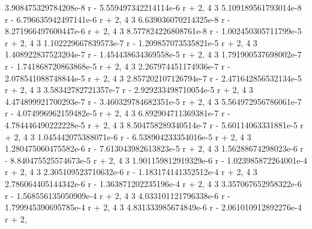 \documentclass[12pt,arial,letterpaper]{book}
\begin{document}
\begin{eulercomment}
\begin{eulercomment}
\begin{eulercomment}
\begin{eulercomment}
\begin{eulercomment}
\begin{eulercomment}
\begin{eulercomment}
\begin{eulercomment}
\begin{eulercomment}
\begin{eulercomment}
\begin{eulercomment}
\begin{eulercomment}
\begin{eulercomment}
\begin{eulercomment}
\begin{eulercomment}
\begin{eulercomment}
\begin{eulercomment}
\begin{eulercomment}
\begin{eulercomment}
\begin{eulercomment}
\begin{eulercomment}
\begin{eulercomment}
\begin{euleroutput}
  3.908475329784208e-8 r  - 5.559497342214114e-6 r  + 2, 
                        4                         3
  5.109189561793014e-8 r  - 6.796635942497141e-6 r  + 2, 
                        4                         3
  6.639036070214325e-8 r  - 8.271966497600447e-6 r  + 2, 
                        4                         3
  8.577824226808761e-8 r  - 1.002450305711799e-5 r  + 2, 
                        4                         3
  1.102229667839573e-7 r  - 1.209857073535821e-5 r  + 2, 
                        4                         3
  1.408922837523204e-7 r  - 1.454438634369558e-5 r  + 2, 
                        4                         3
  1.791900537698002e-7 r  - 1.741868720863868e-5 r  + 2, 
                        4                         3
  2.267974451174936e-7 r  - 2.078541088748844e-5 r  + 2, 
                        4                         3
  2.857202107126794e-7 r  - 2.471642856532134e-5 r  + 2, 
                       4                         3
  3.58342782721357e-7 r  - 2.929233498710054e-5 r  + 2, 
                        4                         3
  4.474899921700293e-7 r  - 3.460329784682351e-5 r  + 2, 
                        4                         3
  5.564972956786061e-7 r  - 4.074996962159482e-5 r  + 2, 
                        4                         3
  6.892904711369381e-7 r  - 4.784446490222228e-5 r  + 2, 
                        4                        3
  8.504758289340514e-7 r  - 5.60114063331881e-5 r  + 2, 
                        4                         3
  1.045442075388071e-6 r  - 6.538904233354016e-5 r  + 2, 
                        4                         3
  1.280475060475582e-6 r  - 7.613043982613823e-5 r  + 2, 
                       4                         3
  1.56288674298023e-6 r  - 8.840475525574673e-5 r  + 2, 
                        4                         3
  1.901159812919329e-6 r  - 1.023985872264001e-4 r  + 2, 
                        4                         3
  2.305109523710632e-6 r  - 1.183174141352512e-4 r  + 2, 
                        4                         3
  2.786064405144342e-6 r  - 1.363871202235196e-4 r  + 2, 
                        4                         3
  3.357067652958322e-6 r  - 1.568556135050909e-4 r  + 2, 
                        4                         3
  4.033101121796338e-6 r  - 1.799945390695785e-4 r  + 2, 
                        4                         3
  4.831333985674849e-6 r  - 2.061010912892276e-4 r  + 2, 

\end{euleroutput}
\end{eulercomment}
\end{eulercomment}
\end{eulercomment}
\end{eulercomment}
\end{eulercomment}
\end{eulercomment}
\end{eulercomment}
\end{eulercomment}
\end{eulercomment}
\end{eulercomment}
\end{eulercomment}
\end{eulercomment}
\end{eulercomment}
\end{eulercomment}
\end{eulercomment}
\end{eulercomment}
\end{eulercomment}
\end{eulercomment}
\end{eulercomment}
\end{eulercomment}
\end{eulercomment}
\end{eulercomment}
\end{document}
